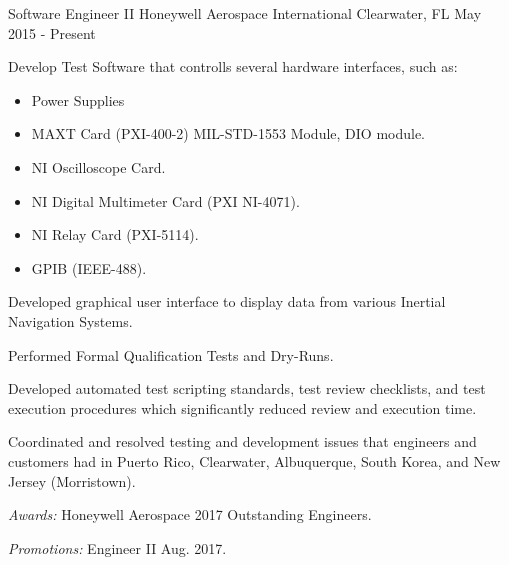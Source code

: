 

\begin{cventries}

  \cventry
    {Software Engineer II} %
    {Honeywell Aerospace International} %
    {Clearwater, FL} %
    {May 2015 - Present} %
    {
      \begin{cvitems} %
				\item {Develop Test Software that controlls several hardware interfaces, such as:}
				\begin{itemize}
					\item Power Supplies
					\item MAXT Card (PXI-400-2) MIL-STD-1553 Module, DIO module.
					\item NI Oscilloscope Card.
					\item NI Digital Multimeter Card (PXI NI-4071).
					\item NI Relay Card (PXI-5114).
					\item GPIB (IEEE-488).
				\end{itemize}
				\item {Developed graphical user interface to display data from various Inertial Navigation Systems.}
				\item {Performed Formal Qualification Tests and Dry-Runs.}
				\item {Developed automated test scripting standards, test review checklists, and test execution procedures which significantly reduced review and execution time.}
				\item {Coordinated and resolved testing and development issues that engineers and customers had in Puerto Rico, Clearwater, Albuquerque, South Korea, and New Jersey (Morristown).}
				\item {{\it Awards:} Honeywell Aerospace 2017 Outstanding Engineers.}
				\item {{\it Promotions:} Engineer II Aug. 2017.}
      \end{cvitems}
    }


\end{cventries}

